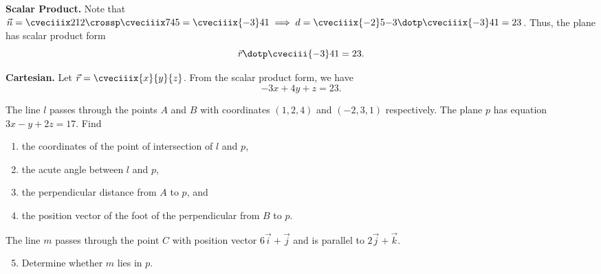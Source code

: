 \begin{solution}
\begin{ppart}
        \textbf{Scalar Product.} Note that $\vec n = \cveciiix212 \crossp \cveciiix745 = \cveciiix{-3}41 \implies d = \cveciiix{-2}5{-3} \dotp \cveciiix{-3}41 = 23$. Thus, the plane has scalar product form \[\vec r \dotp \cveciii{-3}41 = 23.\]

        \textbf{Cartesian.} Let $\vec r = \cveciiix{x}{y}{z}$. From the scalar product form, we have \[-3x + 4y + z = 23.\]
    \end{ppart}
\end{solution}

\begin{problem}
    The line $l$ passes through the points $A$ and $B$ with coordinates $(1, 2, 4)$ and $(-2, 3, 1)$ respectively. The plane $p$ has equation $3x - y + 2z = 17$. Find

    \begin{enumerate}
        \item the coordinates of the point of intersection of $l$ and $p$,
        \item the acute angle between $l$ and $p$,
        \item the perpendicular distance from $A$ to $p$, and
        \item the position vector of the foot of the perpendicular from $B$ to $p$.
    \end{enumerate}

     The line $m$ passes through the point $C$ with position vector $6\vec i + \vec j$ and is parallel to $2\vec j + \vec k$.

    \begin{enumerate}
        \setcounter{enumi}{4}
        \item Determine whether $m$ lies in $p$.
    \end{enumerate}
\end{problem}
